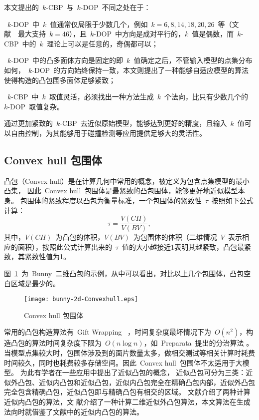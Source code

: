本文提出的~$k$-CBP~与~$k$-DOP~不同之处在于：\\ \indent
\begin{inparaenum}[(1)]
\item ~$k$-DOP~中~$k$~值通常仅局限于少数几个，例如~$k=6,8,14,18,20,26$~等\cite{klosowski1998efficient}（文献~~最大支持~$k=46$），且~$k$-DOP~中方向是成对平行的，$k$~值是偶数，而~$k$-CBP~中的~$k$~理论上可以是任意的，奇偶都可以；\\ \indent
\item ~$k$-DOP~中的凸多面体方向是固定的即~$k$~值确定之后，不管输入模型的点集分布如何，~$k$-DOP~的方向始终保持一致，本文则提出了一种能够自适应模型的算法使得构造的凸包围多面体足够紧致；\\ \indent
\item ~$k$-CBP~中~$k$~取值灵活，必须找出一种方法生成~$k$~个法向，比只有少数几个的~$k$-DOP~取值复杂。\\ \indent
\end{inparaenum} 
通过更加紧致的~$k$-CBP~去近似原始模型，能够达到更好的精度，且输入~$k$~值可以自由控制，为其能够用于碰撞检测等应用提供足够大的灵活性。

\subsection{Convex hull 包围体}
\label{subsec:convexhull}

凸包（Convex hull）是在计算几何中常用的概念，被定义为包含点集模型的最小凸集\cite{dengcg}，
因此~Convex hull~包围体是最紧致的凸包围体，能够更好地近似模型本身。
包围体的紧致程度以凸包为衡量标准，一个包围体的紧致性~$\tau$~按照如下公式计算：
\begin{equation}
\label{equa:judge:tightness}
\tau = \frac{V(CH)}{V(BV)},
\end{equation}
其中，$V(CH)$~为凸包的体积，$V(BV)$~为包围体的体积（二维情况~$V$~表示相应的面积），按照此公式计算出来的~$\tau$~值的大小越接近1表明其越紧致，凸包最紧致，其紧致性值为1。

图~\ref{fig:convexhull-bunny}~为~Bunny~二维凸包的示例，从中可以看出，对比以上几个包围体，凸包空白区域是最少的。
\begin{figure}[htbp] %
  \centering
  \texttt{[image: bunny-2d-Convexhull.eps]}
  \caption{Convex hull 包围体}
  \label{fig:convexhull-bunny}
\end{figure}
常用的凸包构造算法\cite{dengcg}有~Gift Wrapping~%
，时间复杂度最坏情况下为~$O(n^2)$，构造凸包的算法时间复杂度下限为~$O(n\log n)$，如~Preparata~提出的分治算法%
。
当模型点集较大时，包围体涉及到的面片数量太多，做相交测试等相关计算时耗费时间较久，同时也耗费较多存储空间。因此~Convex hull~包围体不太适用于大模型。
为此有学者在一些应用中提出了近似凸包的概念，
近似凸包可分为三类：近似外凸包、近似内凸包和近似凸包\cite{hossain2013constructing}，近似内凸包完全在精确凸包内部，近似外凸包完全包含精确凸包，近似凸包即与精确凸包有相交的区域。
文献介绍了两种计算近似内凸包的算法，文
献介绍了一种计算二维近似外凸包算法，本文算法在生成法向时就借鉴了文献中的近似内凸包的算法。

